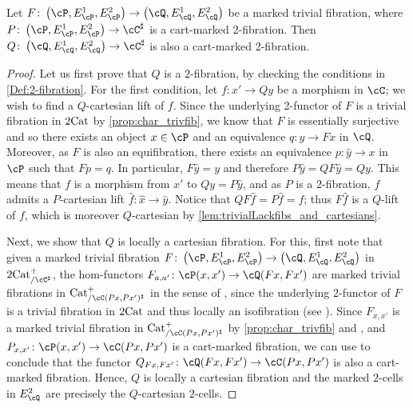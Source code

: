 \documentclass[11pt, dvipsnames]{amsart}
\begin{document}
        \begin{prop}\label{prop:mtf_sends_cart_to_cart}
			Let $F\colon \markedscat{\cP} \to \markedscat{\cQ}$ be a marked trivial fibration, where $P\colon \markedscat{\cP}\to \cC^{\sharp}$ is a cart-marked 2-fibration. Then $Q\colon \markedscat{\cQ}\to \cC^{\sharp}$ is also a cart-marked 2-fibration.
		\end{prop}
		\begin{proof}
			Let us first prove that $Q$ is a $2$-fibration, by checking the conditions in \cref{Def:2-fibration}. For the first condition, let $f\colon x'\to Qy$ be a morphism in $\cC$; we wish to find a $Q$-cartesian lift of $f$. Since the underlying 2-functor of $F$ is a trivial fibration in $2\mathrm{Cat}$ by \cref{prop:char_trivfib}, we know that $F$ is essentially surjective and so there exists an object $x \in \cP$ and an equivalence $q\colon y \to Fx$ in $\cQ$. Moreover, as $F$ is also an equifibration,  there exists an equivalence $p\colon\widehat{y} \to x$ in $\cP$ such that $Fp =q$. In particular, $F\widehat{y}=y$ and therefore $P\widehat{y}=QF\widehat{y} = Qy$. This means that $f$ is a morphism from $x'$ to $Qy = P\widehat{y}$, and as $P$ is a $2$-fibration, $f$ admits a $P$-cartesian lift $\widehat{f}\colon \widehat{x} \to \widehat{y}$. Notice that $QF\widehat{f} = P\widehat{f} = f$; thus $F\widehat{f}$ is a $Q$-lift of $f$, which is moreover $Q$-cartesian by \cref{lem:trivialLackfibs_and_cartesians}. 

			Next, we show that $Q$ is locally a cartesian fibration. For this, first note that given a marked trivial fibration $F\colon \markedscat{\cP} \to \markedscat{\cQ}$ in $\twocat^{+}_{/\cC^\sharp}$, the hom-functors $F_{a,a'}\colon \cP(x,x')\to\cQ(Fx,Fx')$ are marked trivial fibrations in $\cat^{+}_{/\cC(Px,Px')^\sharp}$ in the sense of \cite[Definition 4.15]{mosersarazola2023model}, since the underlying 2-functor of $F$ is a trivial fibration in $2\mathrm{Cat}$ and thus locally an isofibration (see \cite[Corollary 4.18]{mosersarazola2023model}). Since $F_{x,x'}$ is a marked trivial fibration in $\cat^{+}_{/\cC(Px,Px')^\sharp}$ by \cref{prop:char_trivfib} and \cite[Proposition 4.16]{mosersarazola2023model}, and $P_{x,x'}\colon\cP(x,x')\to\cC(Px,Px')$ is a cart-marked fibration, we can use  \cite[Proposition 4.20]{mosersarazola2023model} to conclude that the functor $Q_{Fx,Fx'}\colon\cQ(Fx,Fx')\to\cC(Px,Px')$ is also a cart-marked fibration. Hence, $Q$ is locally a cartesian fibration and the marked $2$-cells in $E^2_{\cQ}$ are precisely the $Q$-cartesian $2$-cells. 
			

\end{proof}
\end{document}
